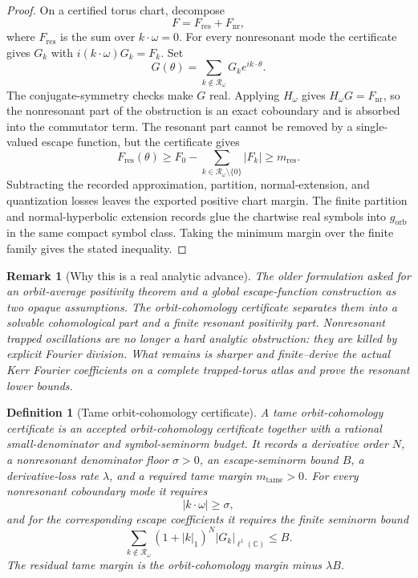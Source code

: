 \documentclass[12pt,a4paper]{article}
\newtheorem{definition}[theorem]{Definition}
\newtheorem{remark}[theorem]{Remark}
\begin{document}
\begin{proof}
On a certified torus chart, decompose
\[
F=F_{\mathrm{res}}+F_{\mathrm{nr}},
\]
where $F_{\mathrm{res}}$ is the sum over $k\cdot\omega=0$.  For every
nonresonant mode the certificate gives $G_k$ with
$i(k\cdot\omega)G_k=F_k$.  Set
\[
G(\theta)=\sum_{k\notin\mathcal R_\omega}G_k e^{ik\cdot\theta}.
\]
The conjugate-symmetry checks make $G$ real.  Applying $H_\omega$ gives
$H_\omega G=F_{\mathrm{nr}}$, so the nonresonant part of the obstruction is an
exact coboundary and is absorbed into the commutator term.  The resonant part
cannot be removed by a single-valued escape function, but the certificate gives
\[
F_{\mathrm{res}}(\theta)\ge
F_0-\sum_{k\in\mathcal R_\omega\setminus\{0\}}|F_k|
\ge m_{\mathrm{res}}.
\]
Subtracting the recorded approximation, partition, normal-extension, and
quantization losses leaves the exported positive chart margin.  The finite
partition and normal-hyperbolic extension records glue the chartwise real
symbols into $g_{\mathrm{orb}}$ in the same compact symbol class.  Taking the
minimum margin over the finite family gives the stated inequality.
\end{proof}

\begin{remark}[Why this is a real analytic advance]
The older formulation asked for an orbit-average positivity theorem and a
global escape-function construction as two opaque assumptions.  The
orbit-cohomology certificate separates them into a solvable cohomological part
and a finite resonant positivity part.  Nonresonant trapped oscillations are no
longer a hard analytic obstruction: they are killed by explicit Fourier
division.  What remains is sharper and finite--derive the actual Kerr Fourier
coefficients on a complete trapped-torus atlas and prove the resonant lower
bounds.
\end{remark}

\begin{definition}[Tame orbit-cohomology certificate]\label{def:tame-orbit-cohomology}
A tame orbit-cohomology certificate is an accepted orbit-cohomology certificate
together with a rational small-denominator and symbol-seminorm budget.  It
records a derivative order $N$, a nonresonant denominator floor
$\sigma>0$, an escape-seminorm bound $B$, a derivative-loss rate $\lambda$, and
a required tame margin $m_{\mathrm{tame}}>0$.  For every nonresonant
coboundary mode it requires
\[
|k\cdot\omega|\ge\sigma,
\]
and for the corresponding escape coefficients it requires the finite seminorm
bound
\[
\sum_{k\notin\mathcal R_\omega}(1+|k|_1)^N |G_k|_{\ell^1(\mathbb C)}
\le B.
\]
The residual tame margin is the orbit-cohomology margin minus
$\lambda B$.
\end{definition}
\end{document}
